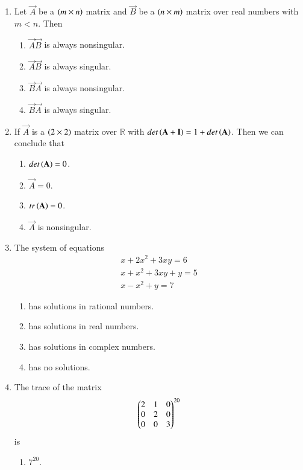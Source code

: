 \renewcommand{\theequation}{\theenumi}
\renewcommand{\thefigure}{\theenumi}
\begin{enumerate}[label=\thesection.\arabic*.,ref=\thesection.\theenumi]

\item Let $\vec{A}$ be a $\left(m \times n\right)$ matrix 
and $\vec{B}$ be a $\left(n \times m\right)$ matrix over real numbers with $m < n$.  Then
\begin{enumerate}
\item $\vec{A}\vec{B}$ is always nonsingular.
\item $\vec{A}\vec{B}$ is always singular.
\item $\vec{B}\vec{A}$ is always nonsingular.
\item $\vec{B}\vec{A}$ is always singular.
\end{enumerate}
%
\item If $\vec{A}$ is a $\left(2\times 2\right)$ matrix over $\mathbb{R}$ with $det\left(\mathbf{A}+\mathbf{I}\right) 
= 1 + det\left(\mathbf{A}\right)$.  Then we can conclude that
\begin{enumerate}
\item $det\left(\mathbf{A}\right) = 0$.
\item $\vec{A} = 0$.
\item $tr\left(\mathbf{A}\right) = 0$.
\item $\vec{A}$ is nonsingular.
\end{enumerate}
%
\item The system of equations
\begin{align}
x+2x^2+3xy = 6 \\
x+x^2+3xy + y = 5 \\
x-x^2+y = 7
\end{align}
\begin{enumerate}
\item has solutions in rational numbers.
\item has solutions in real numbers.
\item has solutions in complex numbers.
\item has no solutions.
\end{enumerate}
%
\item The trace of the matrix
\begin{align}
\begin{pmatrix}
2 & 1 & 0
\\
0 & 2 & 0
\\
0 & 0 & 3
\end{pmatrix}^{20}
\end{align}
is
\begin{enumerate}
\item $7^{20}$.

\end{enumerate}
\end{enumerate}
